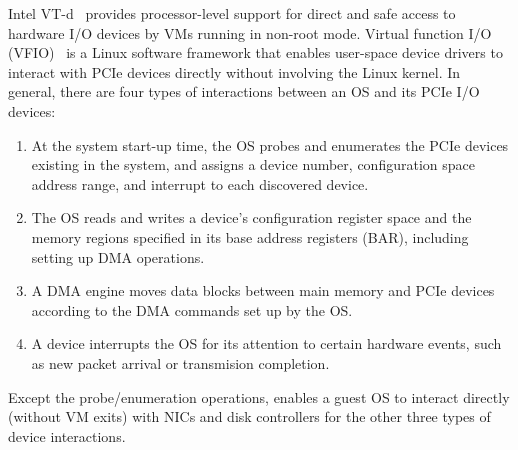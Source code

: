 Intel VT-d~\cite{intelvtd-paper} provides processor-level support for direct 
and safe access to hardware I/O devices by VMs running in non-root mode.
Virtual function I/O (VFIO)~\cite{vfio} is a Linux software framework that enables user-space
device drivers to interact with PCIe devices directly without involving the Linux kernel. 
In general, there are four types of interactions between an OS and its PCIe I/O devices:
\begin{enumerate} 
\parskip 0mm
\itemsep 0mm
\item At the system start-up time, the OS probes and enumerates the PCIe devices existing in the system, and assigns a device number, configuration space address range, and interrupt to each discovered device.

\item The OS reads and writes a device's configuration register space and the memory regions specified in its base address registers (BAR), including setting up DMA operations.

\item A DMA engine moves data blocks between main memory and PCIe devices according to the DMA commands set up by the OS.

\item A device interrupts the OS for its attention to certain hardware events, such as new packet arrival or transmision completion.

\end{enumerate}   
Except the probe/enumeration operations, 
\na enables a guest OS to interact directly (without VM exits) with NICs and disk controllers
for the other three types of device interactions. 

